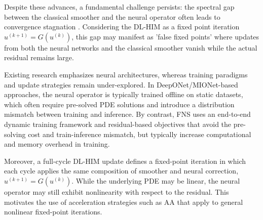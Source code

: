 \documentclass[11pt]{article}
\begin{document}
Despite these advances, a fundamental challenge persists: the spectral gap between the classical smoother and the neural operator often leads to convergence stagnation \cite{kopanivcakova2025deeponet}. Considering the DL-HIM as a fixed point iteration $u^{(k+1)} = G(u^{(k)})$, this gap may manifest as 'false fixed points' where updates from both the neural networks and the classical smoother vanish while the actual residual remains large.

Existing research emphasizes neural architectures, whereas training paradigms and update strategies remain under-explored. In DeepONet/MIONet-based approaches, the neural operator is typically trained offline on static datasets, which often require pre-solved PDE solutions and introduce a distribution mismatch between training and inference. By contrast, FNS uses an end-to-end dynamic training framework and residual-based objectives that avoid the pre-solving cost and train-inference mismatch, but typically increase computational and memory overhead in training.

Moreover, a full-cycle DL-HIM update defines a fixed-point iteration in which each cycle applies the same composition of smoother and neural correction, $u^{(k+1)}=G(u^{(k)})$. While the underlying PDE may be linear, the neural operator may still exhibit nonlinearity with respect to the residual. This motivates the use of acceleration strategies such as AA that apply to general nonlinear fixed-point iterations.
\end{document}
